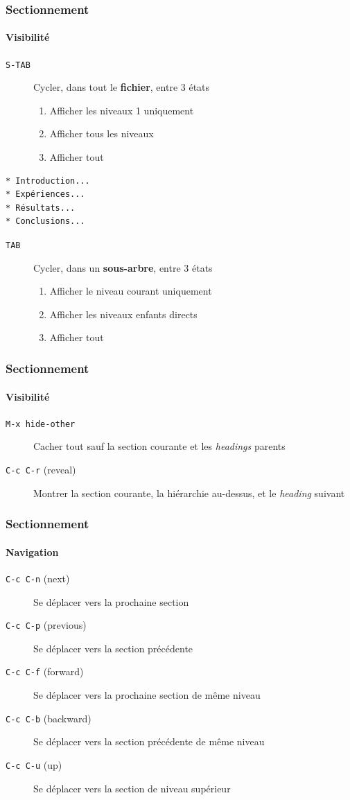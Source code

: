 \documentclass[presentation,t,hideothersubsections]{beamer}
\begin{document}
\begin{frame}[fragile]
\frametitle{Sectionnement}
\framesubtitle{Visibilité}
\label{sec-2-4-3}


\begin{description}
\item[\texttt{S-TAB}] Cycler, dans tout le \textbf{fichier}, entre 3 états
\begin{enumerate}
\item Afficher les niveaux 1 uniquement
\item Afficher tous les niveaux
\item Afficher tout
\end{enumerate}
\end{description}


\lstset{language=org}
\begin{lstlisting}
* Introduction...
* Expériences...
* Résultats...
* Conclusions...
\end{lstlisting}

\begin{description}
\item[\texttt{TAB}] Cycler, dans un \textbf{sous-arbre}, entre 3 états
\begin{enumerate}
\item Afficher le niveau courant uniquement
\item Afficher les niveaux enfants directs
\item Afficher tout
\end{enumerate}
\end{description}
\end{frame}
\begin{frame}
\frametitle{Sectionnement}
\framesubtitle{Visibilité}
\label{sec-2-4-4}


\begin{description}
\item[\texttt{M-x hide-other}] Cacher tout sauf la section courante et les \emph{headings} parents
\item[\texttt{C-c C-r} (reveal)] Montrer la section courante, la hiérarchie au-dessus, et
  le \emph{heading} suivant
\end{description}
\end{frame}
\begin{frame}
\frametitle{Sectionnement}
\framesubtitle{Navigation}
\label{sec-2-4-5}


\begin{description}
\item[\texttt{C-c C-n} (next)] Se déplacer vers la prochaine section
\item[\texttt{C-c C-p} (previous)] Se déplacer vers la section précédente
\item[\texttt{C-c C-f} (forward)] Se déplacer vers la prochaine section de même niveau
\item[\texttt{C-c C-b} (backward)] Se déplacer vers la section précédente de même niveau
\item[\texttt{C-c C-u} (up)] Se déplacer vers la section de niveau supérieur
\end{description}
\end{frame}
\end{document}

